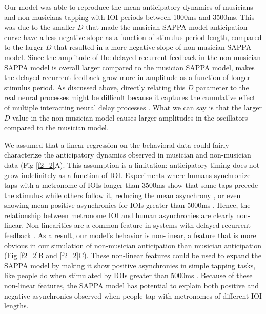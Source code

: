 \documentclass{report}
\begin{document}
Our model was able to reproduce the mean anticipatory dynamics of musicians and non-musicians tapping with IOI periods between 1000ms and 3500ms. This was due to the smaller $D$ that made the musician SAPPA model anticipation curve have a less negative slope as a function of stimulus period length, compared to the larger $D$ that resulted in a more negative slope of non-musician SAPPA model. Since the amplitude of the delayed recurrent feedback in the non-musician SAPPA model is overall larger compared to the musician SAPPA model, makes the delayed recurrent feedback grow more in amplitude as a function of longer stimulus period. As discussed above, directly relating this $D$ parameter to the real neural processes might be difficult because it captures the cumulative effect of multiple interacting neural delay processes \cite{van2003self}. What we can say is that the larger $D$ value in the non-musician model causes larger amplitudes in the oscillators compared to the musician model.

We assumed that a linear regression on the behavioral data could fairly characterize the anticipatory dynamics observed in musician and non-musician data (Fig \ref{f2_2}A). This assumption is a limitation: anticipatory timing does not grow indefinitely as a function of IOI. Experiments where humans synchronize taps with a metronome of IOIs longer than 3500ms show that some taps precede the stimulus while others follow it, reducing the mean asynchrony \cite{baaaath2016estimating}, or even showing mean positive asynchronies for IOIs greater than 5000ms \cite{miyake2004two}. Hence, the relationship between metronome IOI and human asynchronies are clearly non-linear. Non-linearities are a common feature in systems with delayed recurrent feedback \cite{khalil2002nonlinear}. As a result, our model's behavior is non-linear, a feature that is more obvious in our simulation of non-musician anticipation than musician anticipation (Fig \ref{f2_2}B and \ref{f2_2}C). These non-linear features could be used to expand the SAPPA model by making it show positive asynchronies in simple tapping tasks, like people do when stimulated by IOIs greater than 5000ms \cite{miyake2004two}. Because of these non-linear features, the SAPPA model has potential to explain both positive and negative asynchronies observed when people tap with metronomes of different IOI lengths.
\end{document}
